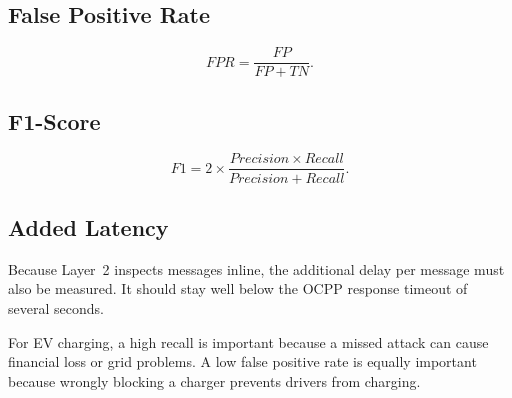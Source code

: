 \documentclass[runningheads]{llncs}
\begin{document}
\subsection{False Positive Rate}
\begin{equation}
\mathit{FPR} = \frac{FP}{FP + TN}.
\end{equation}

\subsection{F1-Score}
\begin{equation}
F1 = 2 \times \frac{\mathit{Precision} \times \mathit{Recall}}{\mathit{Precision} + \mathit{Recall}}.
\end{equation}

\subsection{Added Latency}
Because Layer~2 inspects messages inline, the additional delay per message must also be measured. It should stay well below the OCPP response timeout of several seconds.

For EV charging, a high recall is important because a missed attack can cause financial loss or grid problems. A low false positive rate is equally important because wrongly blocking a charger prevents drivers from charging.

\end{document}
